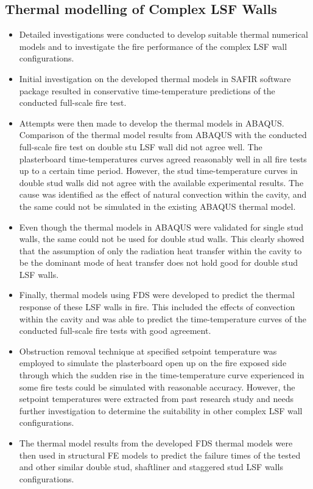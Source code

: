 \subsection{Thermal modelling of Complex LSF Walls}
\begin{itemize}
	\item Detailed investigations were conducted to develop suitable thermal numerical models and to investigate the fire performance of the complex LSF wall configurations. 
	\item Initial investigation on the developed thermal models in SAFIR software package resulted in conservative time-temperature predictions of the conducted full-scale fire test. 
	\item Attempts were then made to develop the thermal models in ABAQUS. Comparison of the thermal model results from ABAQUS with the conducted full-scale fire test on double stu LSF wall did not agree well. The plasterboard time-temperatures curves agreed reasonably well in all fire tests up to a certain time period. However, the stud time-temperature curves in double stud walls did not agree with the available experimental results. The cause was identified as the effect of natural convection within the cavity, and the same could not be simulated in the existing ABAQUS thermal model. 
	\item Even though the thermal models in ABAQUS were validated for single stud walls, the same could not be used for double stud walls. This clearly showed that the assumption of only the radiation heat transfer within the cavity to be the dominant mode of heat transfer does not hold good for double stud LSF walls. 
	\item Finally, thermal models using FDS were developed to predict the thermal response of these LSF walls in fire. This included the effects of convection within the cavity and was able to predict the time-temperature curves of the conducted full-scale fire tests with good agreement. 
	\item Obstruction removal technique at specified setpoint temperature was employed to simulate the plasterboard open up on the fire exposed side through which the sudden rise in the time-temperature curve experienced in some fire tests could be simulated with reasonable accuracy. However, the setpoint temperatures were extracted from past research study and needs further investigation to determine the suitability in other complex LSF wall configurations.
	\item The thermal model results from the developed FDS thermal models were then used in structural FE models to predict the failure times of the tested and other similar double stud, shaftliner and staggered stud LSF walls configurations. 
\end{itemize}

